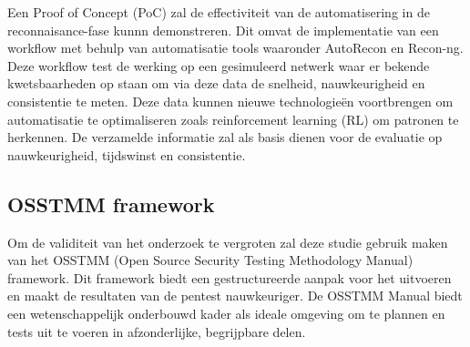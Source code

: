 Een Proof of Concept (PoC) zal de effectiviteit van de automatisering in de reconnaisance-fase kunnn demonstreren.
Dit omvat de implementatie van een workflow met behulp van automatisatie tools waaronder AutoRecon en Recon-ng. 
Deze workflow test de werking op een gesimuleerd netwerk waar er bekende kwetsbaarheden op staan om via deze data de snelheid,
nauwkeurigheid en consistentie te meten. Deze data kunnen nieuwe technologieën voortbrengen om automatisatie te optimaliseren
zoals reinforcement learning (RL) om patronen te herkennen.
De verzamelde informatie zal als basis dienen voor de evaluatie op nauwkeurigheid, tijdswinst en consistentie.






\subsection{OSSTMM framework}

Om de validiteit van het onderzoek te vergroten zal deze studie gebruik maken van het OSSTMM (Open Source Security Testing Methodology Manual) framework. 
Dit framework biedt een gestructureerde aanpak voor het uitvoeren en maakt de resultaten van de pentest nauwkeuriger. 
De OSSTMM Manual biedt een wetenschappelijk onderbouwd kader als ideale omgeving om te plannen en tests uit te voeren in afzonderlijke, begrijpbare delen.

